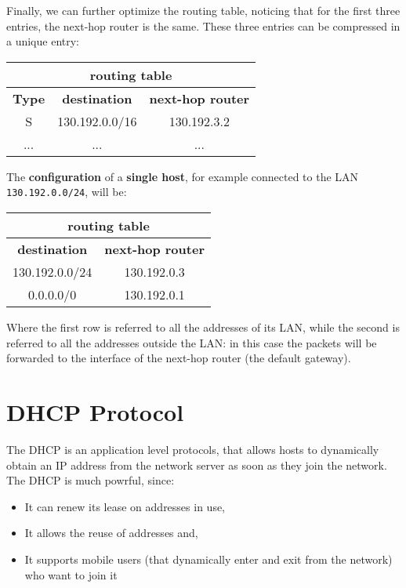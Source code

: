 \noindent Finally, we can further optimize the routing table, noticing that for the first three entries, the next-hop router is the same. These three entries can be compressed in a unique entry:
\begin{table}[h!]
    \centering
    \begin{tabular}{|ccc|}
    \hline
    \multicolumn{3}{|c|}{\textbf{routing table}} \\ \hline
    \multicolumn{1}{|c|}{\textbf{Type}} & \multicolumn{1}{c|}{\textbf{destination}} & \textbf{next-hop router} \\ \hline
    \multicolumn{1}{|c|}{S} & \multicolumn{1}{c|}{130.192.0.0/16} & 130.192.3.2\\ \hline
    \multicolumn{1}{|c|}{...} & \multicolumn{1}{c|}{...} & ...\\ \hline
    \end{tabular}
\end{table}

The \textbf{configuration} of a \textbf{single host}, for example connected to the LAN \texttt{130.192.0.0/24}, will be:

\begin{table}[h!]
    \centering
    \begin{tabular}{|cc|}
    \hline
    \multicolumn{2}{|c|}{\textbf{routing table}} \\ \hline
    \multicolumn{1}{|c|}{\textbf{destination}} & \textbf{next-hop router} \\ \hline
    \multicolumn{1}{|c|}{130.192.0.0/24} & 130.192.0.3 \\ \hline
    \multicolumn{1}{|c|}{0.0.0.0/0} & 130.192.0.1 \\ \hline
    \end{tabular}
\end{table}

\noindent Where the first row is referred to all the addresses of its LAN, while the second is referred to all the addresses outside the LAN: in this case the packets will be forwarded to the interface of the next-hop router (the default gateway).

\section{DHCP Protocol}
The DHCP is an application level protocols, that allows hosts to dynamically obtain an IP address from the network server as soon as they join the network. The DHCP is much powrful, since:
\begin{itemize}
    \item It can renew its lease on addresses in use,
    \item It allows the reuse of addresses and,
    \item It supports mobile users (that dynamically enter and exit from the network) who want to join it
\end{itemize}

